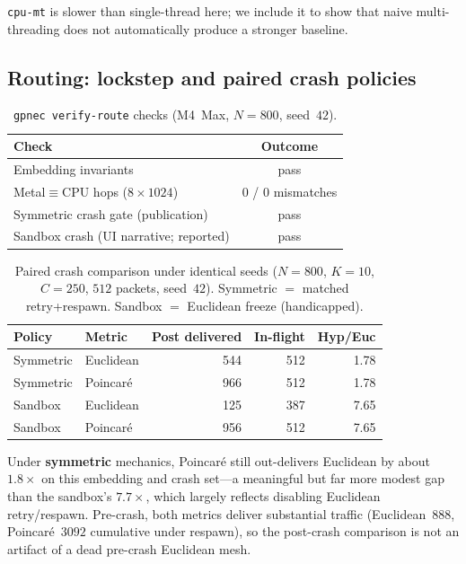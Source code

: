 \documentclass[11pt,a4paper]{article}
\begin{document}
\texttt{cpu-mt} is slower than single-thread here; we include it to show that
naive multi-threading does not automatically produce a stronger baseline.

\subsection{Routing: lockstep and paired crash policies}

\begin{table}[ht]
\centering
\caption{\texttt{gpnec verify-route} checks (M4~Max, $N=800$, seed~$42$).}
\label{tab:route-verify}
\begin{tabular}{@{}lc@{}}
\toprule
Check & Outcome \\
\midrule
Embedding invariants & pass \\
Metal$\equiv$CPU hops ($8\times1024$) & $0$ / $0$ mismatches \\
Symmetric crash gate (publication) & pass \\
Sandbox crash (UI narrative; reported) & pass \\
\bottomrule
\end{tabular}
\end{table}

\begin{table}[ht]
\centering
\caption{Paired crash comparison under identical seeds
($N=800$, $K=10$, $C=250$, $512$ packets, seed~$42$).
Symmetric $=$ matched retry+respawn. Sandbox $=$ Euclidean freeze (handicapped).}
\label{tab:route-paired}
\begin{tabular}{@{}llrrr@{}}
\toprule
Policy & Metric & Post delivered & In-flight & Hyp/Euc \\
\midrule
Symmetric & Euclidean & 544 & 512 & 1.78 \\
Symmetric & Poincar\'e & 966 & 512 & 1.78 \\
Sandbox   & Euclidean & 125 & 387 & 7.65 \\
Sandbox   & Poincar\'e & 956 & 512 & 7.65 \\
\bottomrule
\end{tabular}
\end{table}

Under \textbf{symmetric} mechanics, Poincar\'e still out-delivers Euclidean
by about $1.8\times$ on this embedding and crash set---a meaningful but
far more modest gap than the sandbox's $7.7\times$, which largely reflects
disabling Euclidean retry/respawn. Pre-crash, both metrics deliver
substantial traffic (Euclidean~$888$, Poincar\'e~$3092$ cumulative under
respawn), so the post-crash comparison is not an artifact of a dead
pre-crash Euclidean mesh.
\end{document}
